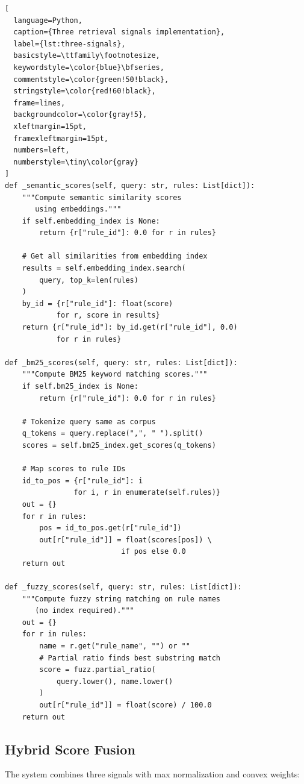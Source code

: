 \begin{lstlisting}[
  language=Python, 
  caption={Three retrieval signals implementation}, 
  label={lst:three-signals},
  basicstyle=\ttfamily\footnotesize,
  keywordstyle=\color{blue}\bfseries,
  commentstyle=\color{green!50!black},
  stringstyle=\color{red!60!black},
  frame=lines,
  backgroundcolor=\color{gray!5},
  xleftmargin=15pt,
  framexleftmargin=15pt,
  numbers=left,
  numberstyle=\tiny\color{gray}
]
def _semantic_scores(self, query: str, rules: List[dict]):
    """Compute semantic similarity scores 
       using embeddings."""
    if self.embedding_index is None:
        return {r["rule_id"]: 0.0 for r in rules}
    
    # Get all similarities from embedding index
    results = self.embedding_index.search(
        query, top_k=len(rules)
    )
    by_id = {r["rule_id"]: float(score) 
            for r, score in results}
    return {r["rule_id"]: by_id.get(r["rule_id"], 0.0) 
            for r in rules}

def _bm25_scores(self, query: str, rules: List[dict]):
    """Compute BM25 keyword matching scores."""
    if self.bm25_index is None:
        return {r["rule_id"]: 0.0 for r in rules}
    
    # Tokenize query same as corpus
    q_tokens = query.replace(",", " ").split()
    scores = self.bm25_index.get_scores(q_tokens)
    
    # Map scores to rule IDs
    id_to_pos = {r["rule_id"]: i 
                for i, r in enumerate(self.rules)}
    out = {}
    for r in rules:
        pos = id_to_pos.get(r["rule_id"])
        out[r["rule_id"]] = float(scores[pos]) \
                           if pos else 0.0
    return out

def _fuzzy_scores(self, query: str, rules: List[dict]):
    """Compute fuzzy string matching on rule names 
       (no index required)."""
    out = {}
    for r in rules:
        name = r.get("rule_name", "") or ""
        # Partial ratio finds best substring match
        score = fuzz.partial_ratio(
            query.lower(), name.lower()
        )
        out[r["rule_id"]] = float(score) / 100.0
    return out
\end{lstlisting}

\subsection{Hybrid Score Fusion}

The system combines three signals with max normalization and convex weights:

